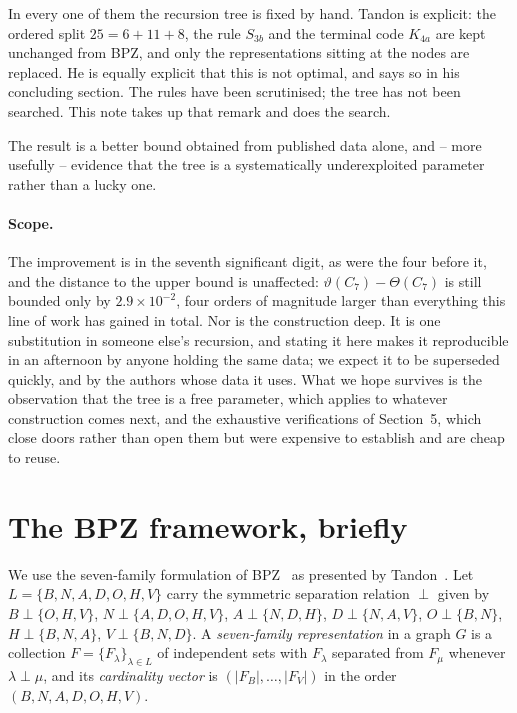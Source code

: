 \documentclass[11pt]{article}
\theoremstyle{definition}
\begin{document}
In every one of them the recursion tree is fixed by hand. Tandon is explicit: the ordered split
$25 = 6 + 11 + 8$, the rule $S_{3b}$ and the terminal code $K_{4a}$ are kept unchanged from BPZ,
and only the representations sitting at the nodes are replaced. He is equally explicit that this
is not optimal, and says so in his concluding section. The rules have been scrutinised; the tree
has not been searched. This note takes up that remark and does the search.

The result is a better bound obtained from published data alone, and --
more usefully -- evidence that the tree is a systematically underexploited parameter rather than a
lucky one.


\paragraph{Scope.}
The improvement is in the seventh significant digit, as were the four before it, and the distance
to the upper bound is unaffected: $\vartheta(C_7) - \Theta(C_7)$ is still bounded only by
$2.9 \times 10^{-2}$, four orders of magnitude larger than everything this line of work has gained
in total. Nor is the construction deep. It is one substitution in someone else's recursion, and
stating it here makes it reproducible in an afternoon by anyone holding the same data; we expect
it to be superseded quickly, and by the authors whose data it uses. What we hope survives is the
observation that the tree is a free parameter, which applies to whatever construction comes next,
and the exhaustive verifications of Section~5, which close doors rather than open them but were
expensive to establish and are cheap to reuse.

\section{The BPZ framework, briefly}

We use the seven-family formulation of BPZ~\cite{BPZ2} as presented by Tandon~\cite{Tandon}. Let
$L = \{B, N, A, D, O, H, V\}$ carry the symmetric separation relation $\perp$ given by
$B \perp \{O,H,V\}$, $N \perp \{A,D,O,H,V\}$, $A \perp \{N,D,H\}$, $D \perp \{N,A,V\}$,
$O \perp \{B,N\}$, $H \perp \{B,N,A\}$, $V \perp \{B,N,D\}$. A \emph{seven-family
representation} in a graph $G$ is a collection $F = \{F_\lambda\}_{\lambda \in L}$ of independent
sets with $F_\lambda$ separated from $F_\mu$ whenever $\lambda \perp \mu$, and its
\emph{cardinality vector} is $(|F_B|, \ldots, |F_V|)$ in the order $(B,N,A,D,O,H,V)$.
\end{document}
